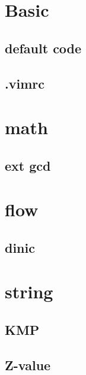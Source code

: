 \documentclass[12pt,twocolumn,oneside]{article}
\begin{document}
\pagestyle{fancy}
\fancyfoot{}
\fancyhead[R]{\thepage}
\renewcommand{\headrulewidth}{0.4pt}
\renewcommand{\contentsname}{Contents} 

\scriptsize
\tableofcontents

\newpage

\section{Basic}
\subsection{default code}


\subsection{.vimrc}


\section{math}
\subsection{ext gcd}


\section{flow}
\subsection{dinic}


\section{string}
\subsection{KMP}


\subsection{Z-value}

\end{document}
